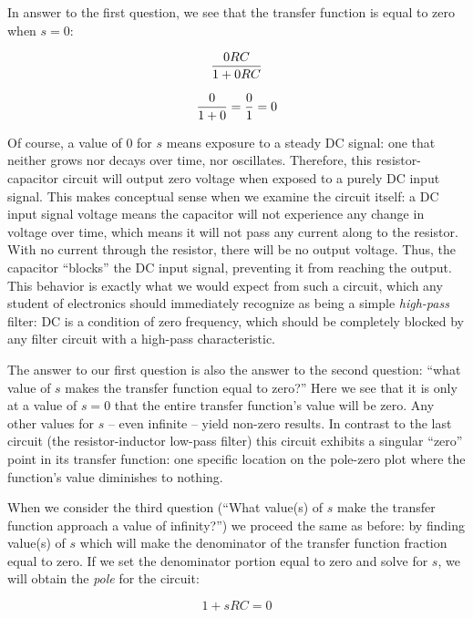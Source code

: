 \filbreak

In answer to the first question, we see that the transfer function is equal to zero when $s = 0$:

$${0RC \over 1 + 0RC}$$

$${0 \over 1 + 0} = {0 \over 1} = 0$$

Of course, a value of 0 for $s$ means exposure to a steady DC signal: one that neither grows nor decays over time, nor oscillates.  Therefore, this resistor-capacitor circuit will output zero voltage when exposed to a purely DC input signal.  This makes conceptual sense when we examine the circuit itself: a DC input signal voltage means the capacitor will not experience any change in voltage over time, which means it will not pass any current along to the resistor.  With no current through the resistor, there will be no output voltage.  Thus, the capacitor ``blocks'' the DC input signal, preventing it from reaching the output.  This behavior is exactly what we would expect from such a circuit, which any student of electronics should immediately recognize as being a simple \textit{high-pass} filter: DC is a condition of zero frequency, which should be completely blocked by any filter circuit with a high-pass characteristic.

\vskip 10pt

The answer to our first question is also the answer to the second question: ``what value of $s$ makes the transfer function equal to zero?''  Here we see that it is only at a value of $s = 0$ that the entire transfer function's value will be zero.  Any other values for $s$ -- even infinite -- yield non-zero results.  In contrast to the last circuit (the resistor-inductor low-pass filter) this circuit exhibits a singular ``zero'' point in its transfer function: one specific location on the pole-zero plot where the function's value diminishes to nothing.    

\vskip 10pt

When we consider the third question (``What value(s) of $s$ make the transfer function approach a value of infinity?'') we proceed the same as before: by finding value(s) of $s$ which will make the denominator of the transfer function fraction equal to zero.  If we set the denominator portion equal to zero and solve for $s$, we will obtain the \textit{pole} for the circuit:    

$$1 + sRC = 0$$

